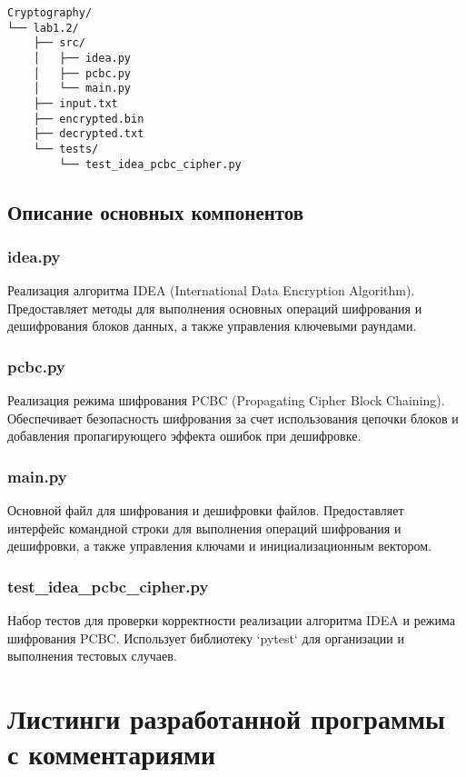 \documentclass[a4paper, 14pt]{report}
\begin{document}
\begin{verbatim}
Cryptography/
└── lab1.2/
    ├── src/
    │   ├── idea.py
    │   ├── pcbc.py
    │   └── main.py
    ├── input.txt
    ├── encrypted.bin
    ├── decrypted.txt
    └── tests/
        └── test_idea_pcbc_cipher.py
\end{verbatim}

\section{Описание основных компонентов}

\subsection{idea.py}

Реализация алгоритма IDEA (International Data Encryption Algorithm). Предоставляет методы для выполнения основных операций шифрования и дешифрования блоков данных, а также управления ключевыми раундами.

\subsection{pcbc.py}
Реализация режима шифрования PCBC (Propagating Cipher Block Chaining). Обеспечивает безопасность шифрования за счет использования цепочки блоков и добавления пропагирующего эффекта ошибок при дешифровке.

\subsection{main.py}
Основной файл для шифрования и дешифровки файлов. Предоставляет интерфейс командной строки для выполнения операций шифрования и дешифровки, а также управления ключами и инициализационным вектором.

\subsection{test\_idea\_pcbc\_cipher.py}

Набор тестов для проверки корректности реализации алгоритма IDEA и режима шифрования PCBC. Использует библиотеку `pytest` для организации и выполнения тестовых случаев.


\chapter{Листинги разработанной программы с комментариями}
\end{document}
